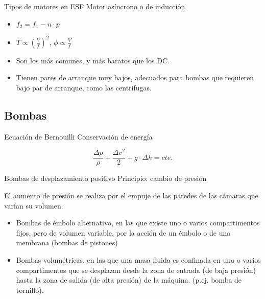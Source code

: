 \documentclass[xcolor={usenames,svgnames,dvipsnames}]{beamer}
\begin{document}
\begin{frame}[label=sec-2-1-7]{Tipos de motores en ESF}
Motor asíncrono o de inducción

\begin{itemize}
\item $f_{2}=f_{1}-n\cdot p$

\item $T\propto\left(\frac{V}{f}\right)^{2}$, $\phi\propto\frac{V}{f}$

\item Son los más comunes, y más baratos que los DC.

\item Tienen \alert{pares de arranque muy bajos}, adecuados para bombas que
requieren bajo par de arranque, como las \alert{centrífugas}.
\end{itemize}
\end{frame}

\subsection{Bombas}
\label{sec-2-2}

\begin{frame}[label=sec-2-2-1]{Ecuación de Bernouilli}
Conservación de energía

$$\frac{\Delta p}{\rho}+\frac{\Delta v^2}{2}+g\cdot\Delta h=cte.$$
\end{frame}

\begin{frame}[label=sec-2-2-2]{Bombas de desplazamiento positivo}
Principio: cambio de presión

El aumento de presión se realiza por el empuje de las paredes de las
cámaras que varían su volumen.

\begin{itemize}
\item \alert{Bombas de émbolo alternativo}, en las que existe uno o varios
compartimentos fijos, pero de volumen variable, por la acción de un
émbolo o de una membrana (bombas de pistones)

\item \alert{Bombas volumétricas}, en las que una masa fluida es confinada en uno
o varios compartimentos que se desplazan desde la zona de entrada (de
baja presión) hasta la zona de salida (de alta presión) de la
máquina. (p.ej. bomba de tornillo).
\end{itemize}
\end{frame}
\end{document}
